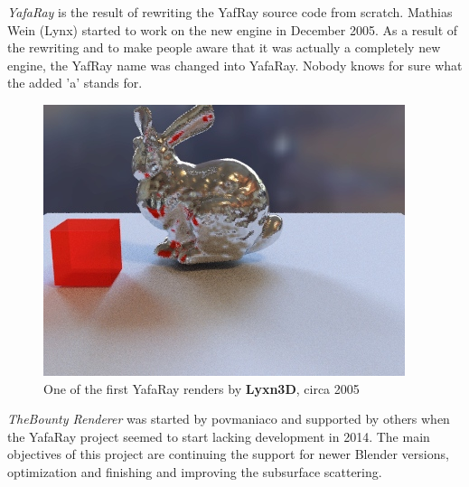\textit{YafaRay} is the result of rewriting the YafRay source code from scratch. Mathias Wein (Lynx) started to work on the new engine in December 2005. As a result of the rewriting and to make people aware that it was actually a completely new engine, the YafRay name was changed into YafaRay. Nobody knows for sure what the added 'a' stands for.

\begin{figure}
    \includegraphics[width=.5\textwidth]{images/bunny_ibl.jpg}
    \caption{One of the first YafaRay renders by \textbf{Lyxn3D}, circa 2005}
\end{figure}

\bigskip

\textit{TheBounty Renderer} was started by povmaniaco and supported by others when the YafaRay project seemed to start lacking development in 2014. The main objectives of this project are continuing the support for newer Blender versions, optimization and finishing and improving the subsurface scattering.
